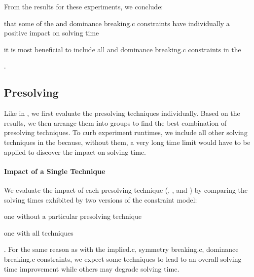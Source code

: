 From the results for these experiments, we conclude:
%
\begin{enumerate*}[label=(\roman*), itemjoin={;\ }, itemjoin*={; but\ }]
  \item that some of the  and \gls{dominance
    breaking.c} \glspl{constraint} have individually a positive impact on
    solving time
  \item it is most beneficial to include all  and
    \gls{dominance breaking.c} \glspl{constraint} in the 
\end{enumerate*}.


\subsection{Presolving}

Like in , we first evaluate the \gls{presolving}
techniques individually.
%
Based on the results, we then arrange them into groups to find the best
combination of \gls{presolving} techniques.
%
To curb experiment runtimes, we include all other solving techniques in the
 because, without them, a very long time limit
would have to be applied to discover the impact on solving time.


\paragraph{Impact of a Single Technique}

We evaluate the impact of each \gls{presolving} technique
(,
,
and ) by comparing the solving times
exhibited by two versions of the \gls{constraint model}:
%
\begin{modelList}
  \item {}
    one without a particular \gls{presolving} technique
  \item {}
    one with all techniques
\end{modelList}.
%
For the same reason as with the \gls{implied.c}, \gls{symmetry breaking.c},
\gls{dominance breaking.c} \glspl{constraint}, we expect some techniques to lead
to an overall solving time improvement while others may degrade solving time.


